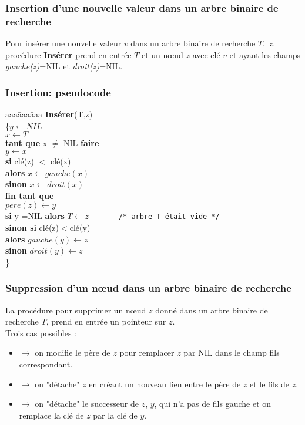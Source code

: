 \begin{frame}
\frametitle{Insertion d’une nouvelle valeur dans un arbre binaire de recherche}
Pour insérer une nouvelle valeur $v$ dans un arbre binaire de recherche $T$, la procédure \textbf{Insérer} prend en entrée $T$ et un n{\oe}ud $z$ avec clé $v$ et ayant les champs \emph{gauche(z)}=NIL et \emph{droit(z)}=NIL.\\
\end{frame}

\begin{frame}
\frametitle{Insertion: pseudocode}
\begin{tabbing}
   aaa\=aaa\=aaa\kill
 \textbf{Insérer}(T,z) \\
\{$y \leftarrow NIL$\\
$x \leftarrow T$\\
\textbf{tant que} x $\neq$ NIL \textbf{faire} \\ 
\> $y \leftarrow x$ \\
\> \textbf{si} clé(z) $<$ clé(x) \\
\>\> \textbf{alors}  $x \leftarrow gauche(x)$ \\
\> \> \textbf{sinon} $x \leftarrow droit(x)$ \\
\textbf{fin tant que} \\
$pere(z) \leftarrow y$\\
\textbf{si} y =NIL \textbf{alors} $T \leftarrow z$ \hfill $~~~~~~~~~~~~~~~$\texttt{/* arbre T était vide */}\\
\textbf{sinon si} clé(z)$<$clé(y) \\ \> \> \textbf{alors} $gauche(y) \leftarrow z$\\
\> \> \textbf{sinon} $droit(y) \leftarrow z$\\ \} 
\end{tabbing}
\end{frame}



\begin{frame}
\frametitle{Suppression d’un n{\oe}ud dans un arbre binaire de recherche}
La procédure pour supprimer un n{\oe}ud  $z$ donné dans un arbre binaire de recherche $T$, prend en entrée un pointeur sur $z$.\\
Trois cas possibles :
\begin{itemize}
\item {} $\rightarrow$ on modifie le père de $z$ pour remplacer $z$ par NIL dans le champ fils correspondant.
\item {} $\rightarrow$ on "détache" $z$ en créant un nouveau lien entre le père de $z$ et le fils de $z$.
\item {} $\rightarrow$ on "détache" le successeur de $z$, $y$, qui n'a pas de fils gauche et on remplace la clé de $z$ par la clé de $y$.
\end{itemize}
\end{frame}



